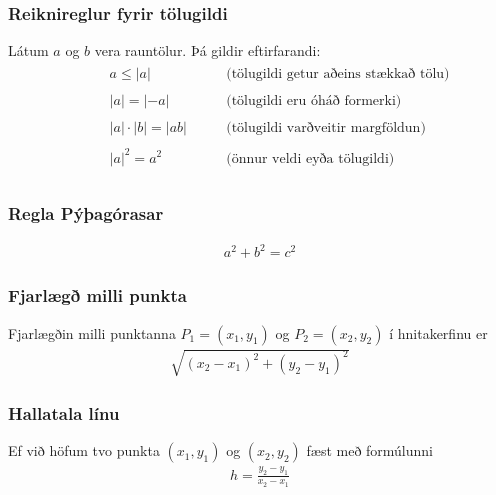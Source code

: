 \documentclass[a4paper,10pt,icelandic]{sphinxmanual}
\begin{document}
\subsubsection{Reiknireglur fyrir tölugildi}
\label{\detokenize{Kafli12:reiknireglur-fyrir-tolugildi}}
Látum \(a\) og \(b\) vera rauntölur. Þá gildir eftirfarandi:
\begin{equation*}
\begin{split}\begin{aligned}
    & a \leq |a|  \qquad  &\text{(tölugildi getur aðeins stækkað tölu)}\\
\qquad \\
    & |a|=|-a|  \qquad  &\text{(tölugildi eru óháð formerki)}\\
\qquad \\
    & |a|\cdot|b|=|ab| \qquad  &\text{(tölugildi varðveitir margföldun)}\\
\qquad \\
    & |a|^2=a^2 \qquad   &\text{(önnur veldi eyða tölugildi)}\\
    \end{aligned}\end{split}
\end{equation*}

\subsubsection{Regla Pýþagórasar}
\label{\detokenize{Kafli12:regla-pyagorasar}}\begin{equation*}
\begin{split}a^2+b^2=c^2\end{split}
\end{equation*}

\subsubsection{Fjarlægð milli punkta}
\label{\detokenize{Kafli12:fjarlaeg-milli-punkta}}
Fjarlægðin milli punktanna \(P_1=(x_1,y_1)\) og \(P_2=(x_2,y_2)\) í hnitakerfinu er
\begin{equation*}
\begin{split}\sqrt{(x_2-x_1)^2+(y_2-y_1)^2}\end{split}
\end{equation*}

\subsubsection{Hallatala línu}
\label{\detokenize{Kafli12:hallatala-linu}}
Ef við höfum tvo punkta \((x_1,y_1)\) og \((x_2,y_2)\) fæst með formúlunni
\begin{equation*}
\begin{split}h=\frac{y_2-y_1}{x_2-x_1}\end{split}
\end{equation*}
\end{document}
